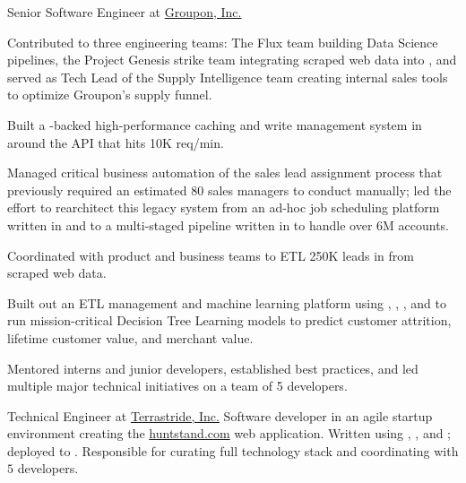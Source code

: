 \documentclass[10pt]{article}
\begin{document}
%
{Senior Software Engineer}%
{at}%
{\href{http://www.groupon.com}{Groupon, Inc.}}%
{Contributed to three engineering teams: The Flux team building Data
  Science pipelines, the Project Genesis strike team integrating
  scraped web data into \salesforce, and served as Tech Lead of the
  Supply Intelligence team creating internal sales tools to optimize
  Groupon's supply funnel.

  \begin{exlist}
  \item Built a \postgres-backed high-performance caching and write
    management system in \clojure around the \salesforce API that hits
    10K req/min.

  \item Managed critical business automation of the sales lead
    assignment process that previously required an estimated 80 sales
    managers to conduct manually; led the effort to rearchitect this
    legacy system from an ad-hoc job scheduling platform written in
    \ruby and \bash to a multi-staged \hadoop pipeline written in
    \clojure to handle over 6M accounts.


  \item Coordinated with product and business teams to ETL 250K leads
    in \salesforce from scraped web data.

  \item Built out an ETL management and machine learning platform
    using \python, \clojure, \hive, and \spark to run mission-critical
    Decision Tree Learning models to predict customer attrition,
    lifetime customer value, and merchant value.

  \item Mentored interns and junior developers, established best
    practices, and led multiple major technical initiatives on a team
    of 5 developers.
  \end{exlist}
}

%
{Technical Engineer}%
{at}%
{\href{http://www.terrastride.com/}{Terrastride, Inc.}}%
{Software developer in an agile startup environment creating the
  \href{http://www.huntstand.com}{huntstand.com} web application.
  Written using \python, \django, and \backbone; deployed to
  .  Responsible for curating full technology stack and
  coordinating with $5$ developers.}
\end{document}
